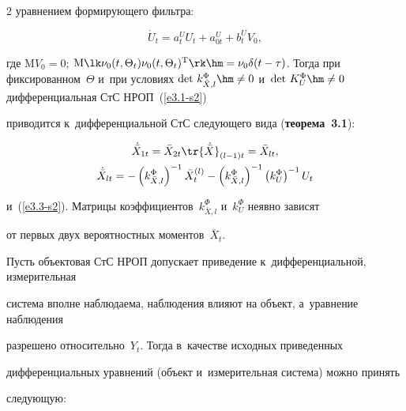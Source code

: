 \begin{multicols}{2}
уравнением формирующего фильтра:

     \begin{equation}

    \dot U_t = a_t^U U_t +  a_{0t}^U + b_t^U V_0,

    \label{e3.3-s2}

    \end{equation}

где $\mathrm{M} V_0 =0$; $ \mathrm{M} \lk \nu_0 (t,\Theta_t) \nu_0(t,\Theta_t)^{\mathrm{T}}\rk\hm = \nu_0 

\delta (t-\tau)$. Тогда при фиксированном~$\Theta$ и~при условиях $\mathrm{det}\ 

k_{\bar X, l}^\Phi\hm \ne 0$ и~$ \mathrm{det}\ K_U^\Phi \hm\ne 0$ дифференциальная СтС НРОП~(\ref{e3.1-s2}) 

приводится к~дифференциальной СтС следующего вида (\textbf{теорема~3.1}):



\noindent

      \begin{multline*}

      \dot{\bar X}_{1t} = \bar X_{2t} \tr {\dot{\bar X}}_{(l-1)t} =\bar 

X_{lt},\\

    \dot{\bar X}_{lt}= -\left(k_{\bar X,l}^\Phi\right)^{-1} \bar X_t^{(l)}-

\left(k_{\bar X, l}^\Phi\right)^{-1}\left(k_{U}^\Phi\right)^{-1} U_t


\end{multline*}

и~(\ref{e3.3-s2}). Мат\-ри\-цы коэффициентов~$k_{\bar X, l}^\Phi$ и~$k_{U}^\Phi$ неявно зависят 

от первых двух вероятностных моментов~$\bar X_t$.







Пусть объектовая СтС НРОП допускает приведение к~дифференциальной, измерительная 

сис\-те\-ма вполне наблюдаема, наблюдения влияют на объект, а~уравнение наблюдения 

разрешено относительно~$Y_t$. Тогда в~качестве исходных приведенных 

дифференциальных уравнений (объект и~измерительная сис\-те\-ма) можно принять 

следующую:




\end{multicols}
